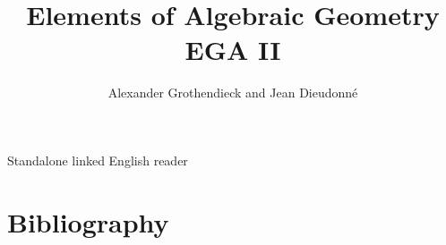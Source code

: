 


\setlength{\emergencystretch}{3em}


\newcommand{\EGAResetVolumeCounters}{%
  \setcounter{section}{0}%
  \setcounter{subsection}{0}%
  \setcounter{equation}{0}%
  \setcounter{figure}{0}%
  \setcounter{table}{0}%
  \setcounter{footnote}{0}%
}

\newcommand{\EGAVolumeTitlePage}[3]{%
  \clearpage
  \EGAResetVolumeCounters
  \renewcommand*{\theHtable}{#1.\arabic{table}}%
  \phantomsection
  \label{section:#1}%
  \pdfbookmark[0]{#2: #3}{volume.#1}%
  \addcontentsline{toc}{part}{#2: #3}%
  \thispagestyle{empty}%
  \vspace*{\fill}%
  \begin{center}
    {\Huge\bfseries #2\par}
    \vspace{1.5em}
    {\LARGE #3\par}
    \vspace{2em}
    {\large Alexander Grothendieck and Jean Dieudonné\par}
    \vspace{1em}
    {\large Standalone English reader\par}
  \end{center}
  \vspace*{\fill}%
  \clearpage
}



\title{Elements of Algebraic Geometry\\EGA II}
\author{Alexander Grothendieck and Jean Dieudonné}
\date{}
\maketitle

\begin{center}
\large Standalone linked English reader
\end{center}

\tableofcontents


\clearpage
{}
{}
\section*{Bibliography}
\nocite{*}




